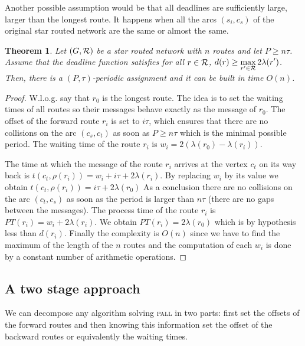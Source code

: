 \documentclass[10pt, conference, letterpaper]{IEEEtran}
\newtheorem{theorem}{Theorem}
\newcommand\pall{\textsc{pall}\xspace}
\begin{document}
	Another possible assumption would be that all deadlines are sufficiently large, larger than the longest route.
	It happens when all the arcs $(s_i,c_s)$ of the original star routed network are the same or almost the same.
		
	 \begin{theorem}\label{th:asym}
	 Let $(G,{\cal R})$ be a star routed network with $n$ routes and let $P \geq n\tau$. Assume that the deadline function 
	 satisfies for all $r\in {\cal R}$, $d(r) \geq \displaystyle{\max_{r' \in  {\cal R}} 2\lambda(r')}$. Then, there is a $(P,\tau)$-periodic assignment and it can be built in time $O(n)$.
	 \end{theorem}
      \begin{proof}
      W.l.o.g. say that $r_0$ is the longest route. The idea is to set the waiting times of all routes so their messages behave exactly as the message of $r_0$.        
        The offset of the forward route $r_i$ is set to $i\tau$, which ensures that there are no collisions on the arc $(c_s,c_t)$ as soon as $P \geq n\tau$ which is the minimal possible period. The waiting time of the route $r_i$ is $w_i = 2(\lambda(r_{0}) - \lambda(r_{i}))$.
        
        The time at which the message of the route $r_i$ arrives at the vertex $c_t$ on its way back is $t(c_t,\rho(r_i)) = w_i + i\tau + 2\lambda(r_{i})$. By replacing $w_i$ by its value we obtain $t(c_t,\rho(r_i)) =  i\tau + 2\lambda(r_{0})$
        As a conclusion there are no collisions on the arc $(c_t,c_s)$ as soon as the period is larger than $n\tau$ (there are no gaps between the messages). The process time of the route $r_i$ is $PT(r_i) = w_i + 2\lambda(r_{i}) $. We obtain $PT(r_i) = 2\lambda(r_{0})$ which is by hypothesis less than $d(r_i)$.
	Finally the complexity is $O(n)$ since we have to find the maximum of the length of the $n$ routes and the computation of each $w_i$ is done by a constant number of arithmetic operations.
     \end{proof}
     
    
     \subsection{A two stage approach}
     
     We can decompose any algorithm solving \pall in two parts: first set the offsets of the forward routes and then knowing this information set the offset of the backward routes or equivalently the waiting times.   
     
\end{document}
